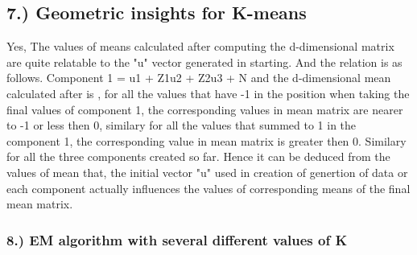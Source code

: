\documentclass[11pt]{article}
\begin{document}
\begin{Verbatim}[commandchars=\\\{\}]
    \end{Verbatim}

    \subsection{7.) Geometric insights for
K-means}\label{geometric-insights-for-k-means}

Yes, The values of means calculated after computing the d-dimensional
matrix are quite relatable to the "u" vector generated in starting. And
the relation is as follows. Component 1 = u1 + Z1u2 + Z2u3 + N and the
d-dimensional mean calculated after is , for all the values that have -1
in the position when taking the final values of component 1, the
corresponding values in mean matrix are nearer to -1 or less then 0,
similary for all the values that summed to 1 in the component 1, the
corresponding value in mean matrix is greater then 0. Similary for all
the three components created so far. Hence it can be deduced from the
values of mean that, the initial vector "u" used in creation of
genertion of data or each component actually influences the values of
corresponding means of the final mean matrix.

    \subsubsection{8.) EM algorithm with several different values of
K}\label{em-algorithm-with-several-different-values-of-k}
\end{document}
